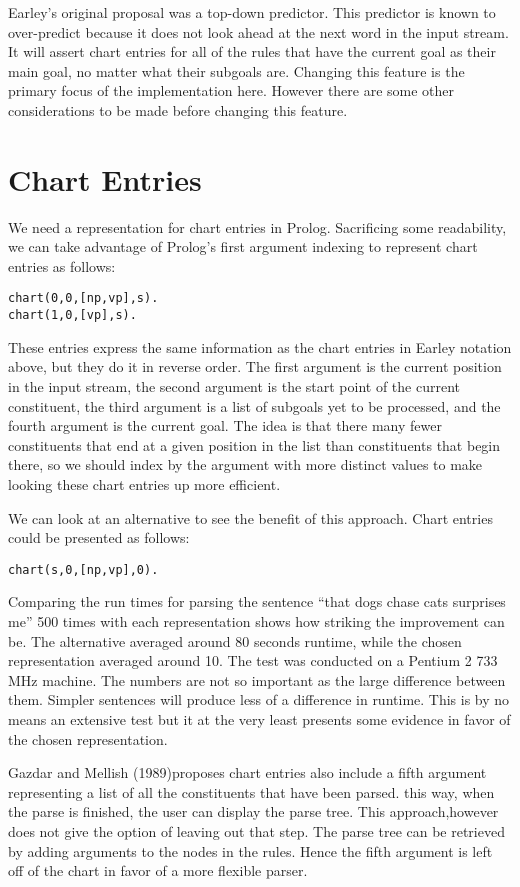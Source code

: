 \documentclass[12pt]{article}
\begin{document}
Earley's original proposal was a top-down predictor.  This predictor is known to over-predict because it does not look ahead at the next word in the input stream.  It will assert chart entries for all of the rules that have the current goal as their main goal, no matter what their subgoals are.  Changing this feature is the primary focus of the implementation here.  However there are some other considerations to be made before changing this feature.

\section{Chart Entries}
We need a representation for chart entries in Prolog.  Sacrificing some readability, we can take advantage of Prolog's first argument indexing to represent chart entries as follows:
\begin{verbatim}
chart(0,0,[np,vp],s).
chart(1,0,[vp],s).
\end{verbatim}
These entries express the same information as the chart entries in Earley notation above, but they do it in reverse order.  The first argument is the current position in the input stream, the second argument is the start point of the current constituent, the third argument is a list of subgoals yet to be processed, and the fourth argument is the current goal.  The idea is that there many fewer constituents that end at a given position in the list than constituents that begin there, so we should index by the argument with more distinct values to make looking these chart entries up more efficient.

We can look at an alternative to see the benefit of this approach. Chart entries could be presented as follows:
\begin{verbatim}
chart(s,0,[np,vp],0).
\end{verbatim}
Comparing the run times for parsing the sentence ``that dogs chase cats surprises me'' 500 times with each representation shows how striking the improvement can be.  The alternative averaged around 80 seconds runtime, while the chosen representation averaged around 10.  The test was conducted on a Pentium 2 733 MHz machine. The numbers are not so important as the large difference between them.  Simpler sentences will produce less of a difference in runtime. This is by no means an extensive test but it at the very least presents some evidence in favor of the chosen representation.

Gazdar and Mellish (1989)proposes chart entries also include a fifth argument representing a list of all the constituents that have been parsed.  this way, when the parse is finished, the user can display the parse tree.  This approach,however does not give the option of leaving out that step.  The parse tree can be retrieved by adding arguments to the nodes in the rules.  Hence the fifth argument is left off of the chart in favor of a more flexible parser.
\end{document}
